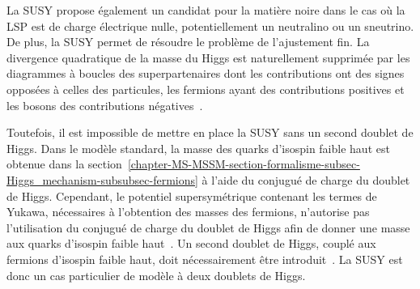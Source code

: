 La SUSY propose également un candidat pour la matière noire dans le cas où la LSP est de charge électrique nulle, potentiellement un neutralino ou un sneutrino.
De plus, la SUSY permet de résoudre le problème de l'ajustement fin.
La divergence quadratique de la masse du Higgs est naturellement supprimée par les diagrammes à boucles des superpartenaires dont les contributions ont des signes opposées à celles des particules, les fermions ayant des contributions positives et les bosons des contributions négatives~\cite{Higgs_hunter_guide}.
\par Toutefois, il est impossible de mettre en place la SUSY sans un second doublet de Higgs.
Dans le modèle standard, la masse des quarks d'isospin faible haut est obtenue dans la section~\ref{chapter-MS-MSSM-section-formalisme-subsec-Higgs_mechanism-subsubsec-fermions} à l'aide du conjugué de charge du doublet de Higgs.
Cependant, le potentiel supersymétrique contenant les termes de Yukawa, nécessaires à l'obtention des masses des fermions, n'autorise pas l'utilisation du conjugué de charge du doublet de Higgs afin de donner une masse aux quarks d'isospin faible haut~\cite{Nagashima_BSM}.
Un second doublet de Higgs, couplé aux fermions d'isospin faible haut, doit nécessairement être introduit~\cite{Nagashima_BSM,Higgs_hunter_guide}.
La SUSY est donc un cas particulier de modèle à deux doublets de Higgs.
